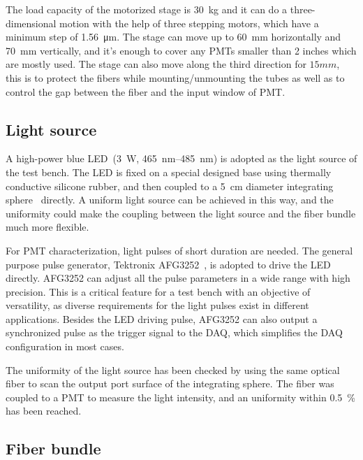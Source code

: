 \documentclass[a4paper,10pt,twoside]{cpc-hepnp}
\begin{document}
\begin{CJK*}{UTF8}{gbsn}
\begin{multicols}{2}
The load capacity of the motorized stage is \SI{30}{\kilo\gram} and it can do a three-dimensional motion with the help of three stepping motors, which have a minimum step of \SI{1.56}{\micro\meter}.
The stage can move up to \SI{60}{\milli\meter} horizontally and \SI{70}{\milli\meter} vertically, and it's enough to cover any PMTs smaller than 2 inches which are mostly used.
The stage can also move along the third direction for $15mm$, this is to protect the fibers while mounting/unmounting the tubes as well as to control the gap between the fiber and the input window of PMT.

\subsection{Light source}
\label{sec:light_source}

A high-power blue LED~\citep{z-light}(\SI{3}{\watt},  \SIrange{465}{485}{\nano\meter}) is adopted as the light source of the test bench.
The LED is fixed on a special designed base using thermally conductive silicone rubber, and then coupled to a  \SI{5}{\centi\meter} diameter integrating sphere~\citep{integrating_sphere} directly.
A uniform light source can be achieved in this way, and the uniformity could make the coupling between the light source and the fiber bundle much more flexible.

For PMT characterization, light pulses of short duration are needed.
The general purpose pulse generator, Tektronix AFG3252~\citep{afg3252}, is adopted to drive the LED directly.
AFG3252 can adjust all the pulse parameters in a wide range with high precision. This is a critical feature for a test bench with an objective of versatility, as diverse requirements for the light pulses exist in different applications. 
Besides the LED driving pulse, AFG3252 can also output a synchronized pulse as the trigger signal to the DAQ, which  simplifies the DAQ configuration in most cases. 

The uniformity of the light source has been checked by using the same optical fiber to scan the output port surface of the integrating sphere. The fiber was coupled to a PMT to measure the light intensity, and an uniformity within \textpm\SI{0.5}{\percent} has been reached.

\subsection{Fiber bundle}
\label{sec:fiber_bundle}


\end{multicols}
\end{CJK*}
\end{document}
